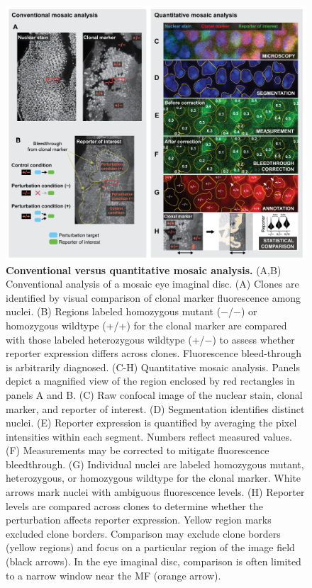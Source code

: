 \documentclass[10pt,letterpaper]{article}
\begin{document}
\begin{figure}[!h]
\centering
\includegraphics[width=1.0\columnwidth]{./figure_2}
\caption{\textbf{Conventional versus quantitative mosaic analysis.}
(A,B) Conventional analysis of a mosaic eye imaginal disc. (A) Clones are identified by visual comparison of clonal marker fluorescence among nuclei. (B) Regions labeled homozygous mutant ($-$/$-$) or homozygous wildtype (+/+) for the clonal marker are compared with those labeled heterozygous wildtype (+/$-$) to assess whether reporter expression differs across clones. Fluorescence bleed-through is arbitrarily diagnosed. (C-H) Quantitative mosaic analysis. Panels depict a magnified view of the region enclosed by red rectangles in panels A and B. (C) Raw confocal image of the nuclear stain, clonal marker, and reporter of interest. (D) Segmentation identifies distinct nuclei. (E) Reporter expression is quantified by averaging the pixel intensities within each segment. Numbers reflect measured values. (F) Measurements may be corrected to mitigate fluorescence bleedthrough. (G) Individual nuclei are labeled homozygous mutant, heterozygous, or homozygous wildtype for the clonal marker. White arrows mark nuclei with ambiguous fluorescence levels. (H) Reporter levels are compared across clones to determine whether the perturbation affects reporter expression. Yellow region marks excluded clone borders. Comparison may exclude clone borders (yellow regions) and focus on a particular region of the image field (black arrows). In the eye imaginal disc, comparison is often limited to a narrow window near the MF (orange arrow).}
\label{fig2}
\end{figure}
\end{document}
